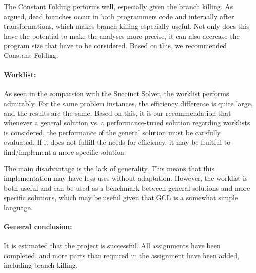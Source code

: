 The Constant Folding performs well, especially given the branch killing. As argued,
dead branches occur in both programmers code and internally after transformations,
which makes branch killing especially useful. Not only does this have the potential
to make the analyses more precise, it can also decrease the program size that have
to be considered. Based on this, we recommended Constant Folding.

\paragraph{Worklist:}
As seen in the comparsion with the Succinct Solver, the worklist performs admirably.
For the same problem instances, the efficiency difference is quite large, and the
results are the same. Based on this, it is our recommendation that whenever a
general solution vs. a performance-tuned solution regarding worklists is considered,
the performance of the general solution must be carefully evaluated. If it does not
fulfill the needs for efficiency, it may be fruitful to find/implement a more
specific solution.

The main disadvantage is the lack of generality. This means that this implementation
may have less uses without adaptation. However, the worklist is both useful and can
be used as a benchmark between general solutions and more specific solutions,
which may be useful given that GCL is a somewhat simple language.

\paragraph{General conclusion:}
It is estimated that the project is successful. All assignments have
been completed, and more parts than required in the assignment have been added,
including branch killing.

